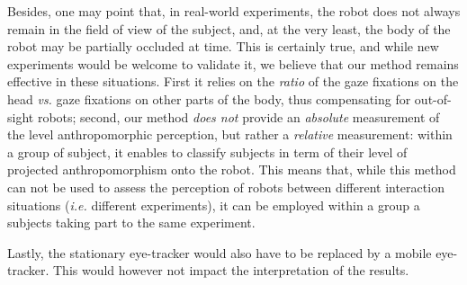 \documentclass[lettersize, noapacite, twoside, HRI]{apa_HRI}
\newcommand{\ie}{\textit{i.e.}\xspace}
\newcommand{\vs}{\textit{vs.}\xspace}
\begin{document}
Besides, one may point that, in real-world experiments, the robot does not
always remain in the field of view of the subject, and, at the very least, the
body of the robot may be partially occluded at time.  This is certainly true,
and while new experiments would be welcome to validate it, we believe that our
method remains effective in these situations. First it relies on the
\emph{ratio} of the gaze fixations on the head \vs gaze fixations on other parts
of the body, thus compensating for out-of-sight robots; second, our method
\emph{does not} provide an \emph{absolute} measurement of the level
anthropomorphic perception, but rather a \emph{relative} measurement: within a
group of subject, it enables to classify subjects in term of their level of
projected anthropomorphism onto the robot.  This means that, while this method
can not be used to assess the perception of robots between different interaction
situations (\ie different experiments), it can be employed within a group a
subjects taking part to the same experiment.

Lastly, the stationary eye-tracker would also have to be replaced by a mobile
eye-tracker. This would however not impact the interpretation of the results.

%
%
%
%
%



%
%
\end{document}
